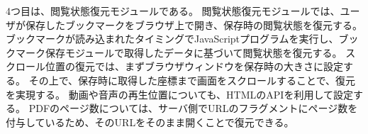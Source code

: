 4つ目は、閲覧状態復元モジュールである。
閲覧状態復元モジュールでは、ユーザが保存したブックマークをブラウザ上で開き、保存時の閲覧状態を復元する。
ブックマークが読み込まれたタイミングでJavaScriptプログラムを実行し、ブックマーク保存モジュールで取得したデータに基づいて閲覧状態を復元する。
スクロール位置の復元では、まずブラウザウィンドウを保存時の大きさに設定する。
その上で、保存時に取得した座標まで画面をスクロールすることで、復元を実現する。
動画や音声の再生位置についても、HTMLのAPIを利用して設定する。
PDFのページ数については、サーバ側でURLのフラグメントにページ数を付与しているため、そのURLをそのまま開くことで復元できる。
